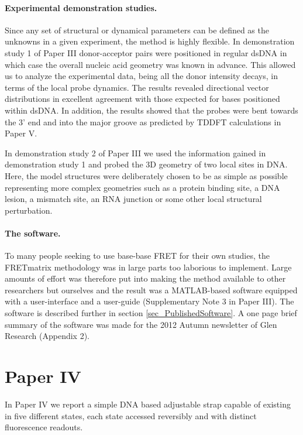  \paragraph{Experimental demonstration studies.} Since any set of structural or dynamical parameters can be defined as the unknowns in a given experiment, the method is highly flexible. In demonstration study 1 of Paper III donor-acceptor pairs were positioned in regular dsDNA in which case the overall nucleic acid geometry was known in advance. This allowed us to analyze the experimental data, being all the donor intensity decays, in terms of the local probe dynamics. The results revealed directional vector distributions in excellent agreement with those expected for bases positioned within dsDNA. In addition, the results showed that the probes were bent towards the 3' end and into the major groove as predicted by TDDFT calculations in Paper V.

 In demonstration study 2 of Paper III we used the information gained in demonstration study 1 and probed the 3D geometry of two local sites in DNA. Here, the model structures were deliberately chosen to be as simple as possible representing more complex geometries such as a protein binding site, a DNA lesion, a mismatch site, an RNA junction or some other local structural perturbation.

 \paragraph{The software.} To many people seeking to use base-base FRET for their own studies, the FRETmatrix methodology was in large parts too laborious to implement. Large amounts of effort was therefore put into making the method available to other researchers but ourselves and the result was a MATLAB-based software equipped with a user-interface and a user-guide (Supplementary Note 3 in Paper III). The software is described further in section \ref{sec_PublishedSoftware}. A one page brief summary of the software was made for the 2012 Autumn newsletter of Glen Research (Appendix 2).

\section{Paper IV}
 In Paper IV we report a simple DNA based adjustable strap capable of existing in five different states, each state accessed reversibly and with distinct fluorescence readouts.

